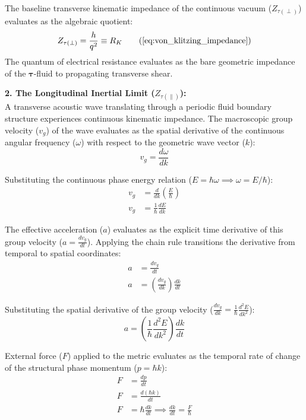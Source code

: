 \documentclass[11pt, a4paper]{article}
\begin{document}
The baseline transverse kinematic impedance of the continuous vacuum ($Z_{\tau(\perp)}$) evaluates as the algebraic quotient:
\begin{equation}
    Z_{\tau(\perp)} = \frac{h}{q^2} \equiv R_K \tag{\ref{eq:von_klitzing_impedance}}
\end{equation}
The quantum of electrical resistance evaluates as the bare geometric impedance of the $\boldsymbol{\tau}$-fluid to propagating transverse shear.

\textbf{2. The Longitudinal Inertial Limit ($Z_{\tau(\parallel)}$):} \\
A transverse acoustic wave translating through a periodic fluid boundary structure experiences continuous kinematic impedance. The macroscopic group velocity ($v_g$) of the wave evaluates as the spatial derivative of the continuous angular frequency ($\omega$) with respect to the geometric wave vector ($k$):
\begin{equation}
    v_g = \frac{d\omega}{dk} 
\end{equation}

Substituting the continuous phase energy relation ($E = \hbar \omega \implies \omega = E/\hbar$):
\begin{align}
    v_g &= \frac{d}{dk} \left( \frac{E}{\hbar} \right)  \\
    v_g &= \frac{1}{\hbar} \frac{dE}{dk} 
\end{align}

The effective acceleration ($a$) evaluates as the explicit time derivative of this group velocity ($a = \frac{dv_g}{dt}$). Applying the chain rule transitions the derivative from temporal to spatial coordinates:
\begin{align}
    a &= \frac{dv_g}{dt}  \\
    a &= \left( \frac{dv_g}{dk} \right) \frac{dk}{dt} 
\end{align}

Substituting the spatial derivative of the group velocity ($\frac{dv_g}{dk} = \frac{1}{\hbar} \frac{d^2 E}{dk^2}$):
\begin{equation}
    a = \left( \frac{1}{\hbar} \frac{d^2 E}{dk^2} \right) \frac{dk}{dt} 
\end{equation}

External force ($F$) applied to the metric evaluates as the temporal rate of change of the structural phase momentum ($p = \hbar k$):
\begin{align}
    F &= \frac{dp}{dt}  \\
    F &= \frac{d(\hbar k)}{dt}  \\
    F &= \hbar \frac{dk}{dt} \implies \frac{dk}{dt} = \frac{F}{\hbar} 
\end{align}
\end{document}
